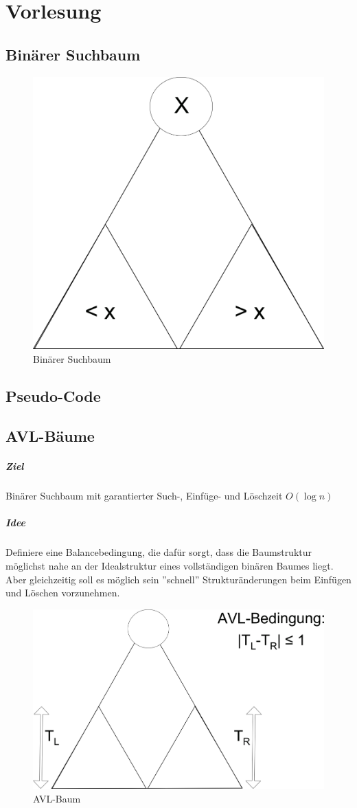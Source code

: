 \chapter{Vorlesung}
\section{Binärer Suchbaum}

\begin{figure}[H]
\includegraphics[width=0.2\linewidth]{10/Grafik/img1.png}
\captionsetup{justification=raggedright, singlelinecheck=false}
\caption{Binärer Suchbaum}
\end{figure}

\section{Pseudo-Code}


\pagebreak

\section{AVL-Bäume}
\paragraph{Ziel}Binärer Suchbaum mit garantierter Such-, Einfüge- und Löschzeit $O(\log n )$
\paragraph{Idee} Definiere eine Balancebedingung, die dafür sorgt, dass die Baumstruktur möglichst nahe an der Idealstruktur eines vollständigen binären Baumes liegt.\\
Aber gleichzeitig soll es möglich sein ''schnell'' Strukturänderungen beim Einfügen und Löschen vorzunehmen. \\

\begin{figure}[H]
\includegraphics[width=0.4\linewidth]{10/Grafik/img2.png}
\captionsetup{justification=raggedright, singlelinecheck=false}
\caption{AVL-Baum}
\end{figure}



